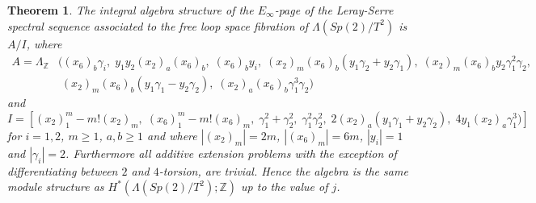 \documentclass{article}
\theoremstyle{plain}
\newtheorem{thm}{Theorem}[section]
\theoremstyle{definition}
\numberwithin{thm}{section}
\begin{document}
		\begin{thm}\label{thm:FreeLoopSp(2)/T}
				The integral algebra structure of the $E_\infty$-page of the Leray-Serre spectral sequence associated to the free loop space fibration of $\Lambda(Sp(2)/T^2)$
				is $A/I$, where
			\begin{align*}
				A=\Lambda_{\mathbb{Z}}&((x_6)_b\gamma_i,\;y_1y_2(x_2)_a(x_6)_b,\;(x_6)_by_i,\;(x_2)_m(x_6)_b(y_1\gamma_2+y_2\gamma_1),\;(x_2)_m(x_6)_by_2\gamma_1^2\gamma_2, \\
					&\;(x_2)_m(x_6)_b(y_1\gamma_1-y_2\gamma_2),\;(x_2)_a(x_6)_b\gamma_1^3\gamma_2)
			\end{align*}
			and
			\begin{equation*}
				I=[(x_2)_1^m-m!(x_2)_m,\;(x_6)_1^m-m!(x_6)_m,\;\gamma_1^2+\gamma_2^2,\;\gamma_1^2\gamma_2^2,\;2(x_2)_a(y_1\gamma_1+y_2\gamma_2),\;4y_1(x_2)_a\gamma_1^3)]
			\end{equation*}
			for $i=1,2$, $m\geq 1$, $a,b\geq 1$ and where $|(x_2)_m|=2m$, $|(x_6)_m|=6m$, $|y_i|=1$ and $|\gamma_i|=2$.
			Furthermore all additive extension problems with the exception of differentiating between $2$ and $4$-torsion, are trivial.
			Hence the algebra is the same module structure as $H^*(\Lambda(Sp(2)/T^{2});\mathbb{Z})$ up to the value of $j$.
		\end{thm}
		
\end{document}
